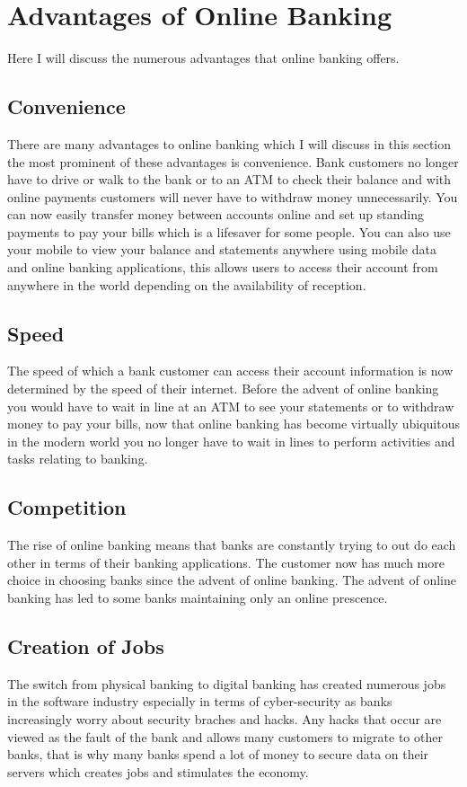 \section{Advantages of Online Banking}
Here I will discuss the numerous advantages that online banking offers.
\subsection{Convenience}
There are many advantages to online banking which I will discuss in this section
the most prominent of these advantages is convenience.  Bank customers no longer
have to drive or walk to the bank or to an ATM to check their balance and with online
payments customers will never have to withdraw money unnecessarily.  You can now
easily transfer money between accounts online and set up standing payments to pay
your bills which is a lifesaver for some people. You can also use your mobile to
view your balance and statements anywhere using mobile data and online banking applications,
this allows users to access their account from anywhere in the world depending on the
availability of reception.
\subsection{Speed}
The speed of which a bank customer can access their account information is now
determined by the speed of their internet.  Before the advent of online banking
you would have to wait in line at an ATM to see your statements or to withdraw
money to pay your bills, now that online banking has become virtually ubiquitous
in the modern world you no longer have to wait in lines to perform activities and
tasks relating to banking.
\subsection{Competition}
The rise of online banking means that banks are constantly trying to out do each
other in terms of their banking applications.  The customer now has much more choice
in choosing banks since the advent of online banking. The advent of online banking has
led to some banks maintaining only an online prescence.\cite{OnlineBanking}
\subsection{Creation of Jobs}
The switch from physical banking to digital banking has created numerous jobs
in the software industry especially in terms of cyber-security as banks increasingly
worry about security braches and hacks.  Any hacks that occur are viewed as the fault
of the bank and allows many customers to migrate to other banks, that is why many banks
spend a lot of money to secure data on their servers which creates jobs and stimulates
the economy.

